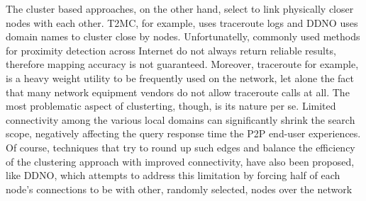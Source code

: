 The cluster based approaches, on the other hand, select to link physically
closer nodes with each other. T2MC, for example, uses traceroute logs and DDNO
uses domain names to cluster close by nodes. Unfortunatelly, commonly used
methods for proximity detection across Internet do not always return
reliable results, therefore mapping accuracy is not guaranteed. Moreover,
traceroute for example, is a heavy weight utility to be frequently used on the
network, let alone the fact that many network equipment vendors do not allow
traceroute calls at all. The most problematic aspect of clusterting, though, is
its nature per se. Limited connectivity among the various local domains can
significantly shrink the search scope, negatively affecting the query response
time the P2P end-user experiences. Of course, techniques that try to round up
such edges and balance the efficiency of the clustering approach with improved
connectivity, have also been proposed, like DDNO, which attempts to address this
limitation by forcing half of each node's connections to be with other, randomly
selected, nodes over the network

%
%
%
%

